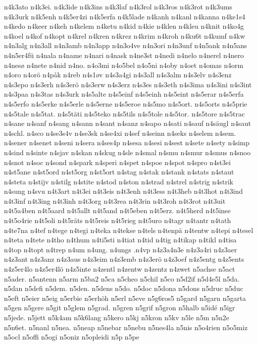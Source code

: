 {{n4k3ato
n4k3ei.
n4k3ide
n4k3ins
n4k3laf
n4k3rol
n4k3ros
n4k3rot
n4k3ums
n4k3urk
n4k5enh
n4k5er4zi
n4k5erfa
n4k5lade
n4kanh
n4kanl
n4kanna
n4ke1s4
n4kedo
n4keer
n4keh
n4kelem
n4ketu
n4kid
n4kie
n4klen
n4kleu
n4knit
n4ko4g
n4koel
n4kof
n4kopt
n4krel
n4kren
n4krez
n4krim
n4kroh
n4ku6t
n4kumf
n4kw
n4n3alg
n4n3all
n4n3amb
n4n3app
n4n3o4ve
n4n3ori
n4n3unf
n4n5ank
n4n5ans
n4n5er4fü
n4nala
n4name
n4nari
n4nask
n4ne3st
n4nedi
n4nelo
n4nerel
n4nero
n4nesø
n4nete
n4nid
n4no.
n4o3mi
n4o5bel
n4o5ni
n4oby
n4oet
n4omas
n4orm
n4oro
n4orö
n4påk
n4reb
n4s1øv
n4s3a4gi
n4s3all
n4s3alm
n4s3elv
n4s3enz
n4s3epo
n4s3erh
n4s3erö
n4s3erw
n4s3erz
n4s3es
n4s3eth
n4s3ima
n4s3ini
n4s3int
n4s3paa
n4s3tas
n4s3urk
n4s5alte
n4s5einf
n4s5einh
n4s5eint
n4s5erar
n4s5erfa
n4s5erfo
n4s5erke
n4s5erle
n4s5erne
n4s5eroe
n4s5mo
n4s5ort.
n4s5orts
n4s5prie
n4s5tale
n4s5tat.
n4s5täti
n4s5teko
n4s5tils
n4s5tole
n4s5tor.
n4s5tore
n4s5trac
n4sane
n4sanf
n4sang
n4sann
n4sant
n4sanz
n4sapo
n4sati
n4sauf
n4säugl
n4saut
n4schl.
n4sco
n4se3s4v
n4se3sk
n4se4xi
n4sef
n4seinn
n4seks
n4selem
n4sem.
n4sener
n4senet
n4seni
n4sera
n4ses4p
n4sesa
n4sesi
n4sest
n4sete
n4sety
n4simp
n4sind
n4sinte
n4sjav
n4skan
n4skug
n4sle
n4smal
n4smu
n4smur
n4smus
n4snoo
n4snot
n4soc
n4sond
n4spark
n4speri
n4spet
n4spoe
n4spot
n4spro
n4st3ei
n4st5ane
n4st5ord
n4st5org
n4st5ort
n4stag
n4stak
n4stank
n4stats
n4staut
n4steta
n4stijv
n4stilg
n4stite
n4stod
n4ston
n4strad
n4strel
n4strig
n4strik
n4sung
n4svu
n4t3art
n4t3ei
n4t3eis
n4t3enh
n4t3ess
n4t3heb
n4t3hot
n4t3ind
n4t3inf
n4t3ing
n4t3inh
n4t3org
n4t3rea
n4t3rin
n4t3roh
n4t3rot
n4t3uit
n4t5a4ben
n4t5aard
n4t5allt
n4t5and
n4t5eben
n4t5erz.
n4t5herd
n4t5inse
n4t5o4rie
n4t5oli
n4t5räts
n4t5reis
n4t5rieg
n4t5uro
n4tagr
n4tantr
n4tath
n4te7na
n4tef
n4tege
n4tegi
n4teka
n4tekse
n4tels
n4tenpä
n4tentw
n4tepi
n4tesel
n4teta
n4tete
n4tho
n4thum
n4ti5sti
n4tiat
n4tid
n4tig
n4tikap
n4tikl
n4tisa
n4top
n4topt
n4trep
n4um
n4ung.
n4ungs
.n4vp
n4z3a4n3e
n4z3a4ri
n4z3aer
n4z3ant
n4z3anz
n4z3aus
n4z3eim
n4z3emb
n4z3erö
n4z3oef
n4z5entg
n4z5ents
n4z5er4lo
n4z5er4lö
n4z5inte
n4zentl
n4zentw
n4zentz
n4zwet
n5achse
n5act
n5ader.
n5antenn
n5arm
n5ba2
n5ca
n5cheo
n5chil
n5co
n5d2if
n5d4e5l
n5da.
n5dan
n5defi
n5dem.
n5den.
n5dens
n5do.
n5doc
n5dona
n5dons
n5druc
n5duc
n5eft
n5eier
n5eig
n5erbie
n5erhöh
n5erl
n5eve
n5g6ros5
n5gard
n5garn
n5garta
n5gen
n5gere
n5git
n5glem
n5grad.
n5gren
n5grif
n5gron
n5halb
n5idé
n5igr
n5jede.
n5jett
n5k4am
n5k6lang
n5kero
n5kj
n5kron
n5kv
n5le
n5m
n5n2e
n5n6et.
n5nanl
n5nea.
n5neap
n5nebar
n5nebu
n5nes4la
n5nis
n5o4rien
n5o5miz
n5ocl
n5offi
n5ogi
n5oniz
n5opleidi
n5p
n5pe
}}
